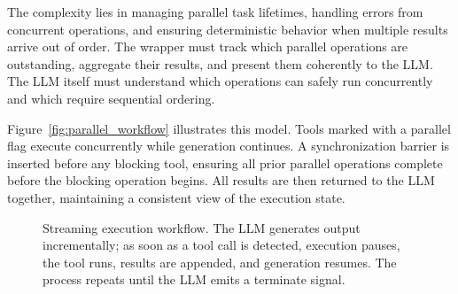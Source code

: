 The complexity lies in managing parallel task lifetimes, handling errors from concurrent operations, and ensuring deterministic behavior when multiple results arrive out of order. The wrapper must track which parallel operations are outstanding, aggregate their results, and present them coherently to the LLM. The LLM itself must understand which operations can safely run concurrently and which require sequential ordering.

Figure~\ref{fig:parallel_workflow} illustrates this model. Tools marked with a parallel flag execute concurrently while generation continues. A synchronization barrier is inserted before any blocking tool, ensuring all prior parallel operations complete before the blocking operation begins. All results are then returned to the LLM together, maintaining a consistent view of the execution state.

\begin{figure}[t]
\centering
{}
\caption{Streaming execution workflow. The LLM generates output incrementally; as soon as a tool call is detected, execution pauses, the tool runs, results are appended, and generation resumes. The process repeats until the LLM emits a terminate signal.}
\label{fig:streaming}
\end{figure}

